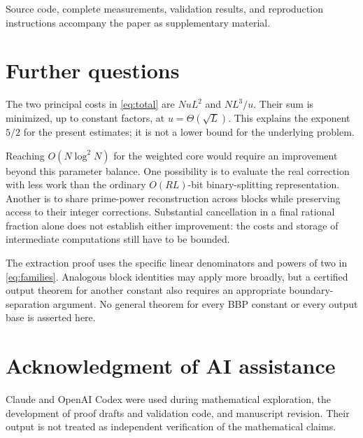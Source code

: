 \documentclass[11pt]{article}
\numberwithin{equation}{section}
\theoremstyle{definition}
\begin{document}
Source code, complete measurements, validation results, and
reproduction instructions accompany the paper as supplementary material.

\section{Further questions}

The two principal costs in \eqref{eq:total} are
$NuL^2$ and $NL^3/u$. Their sum is minimized, up to
constant factors, at $u=\Theta(\sqrt L)$. This explains
the exponent $5/2$ for the present estimates; it is not
a lower bound for the underlying problem.

Reaching $O(N\log^2N)$ for the weighted core would require
an improvement beyond this parameter balance. One possibility
is to evaluate the real correction with less work than the
ordinary $O(RL)$-bit binary-splitting representation.
Another is to share prime-power reconstruction across blocks
while preserving access to their integer corrections.
Substantial cancellation in a final rational fraction alone
does not establish either improvement: the costs and storage
of intermediate computations still have to be bounded.

The extraction proof uses the specific linear denominators
and powers of two in \eqref{eq:families}. Analogous block
identities may apply more broadly, but a certified output
theorem for another constant also requires an appropriate
boundary-separation argument. No general theorem for every
BBP constant or every output base is asserted here.

\section*{Acknowledgment of AI assistance}

Claude and OpenAI Codex were used during mathematical
exploration, the development of proof drafts and validation
code, and manuscript revision. Their output is not treated
as independent verification of the mathematical claims.
\end{document}
